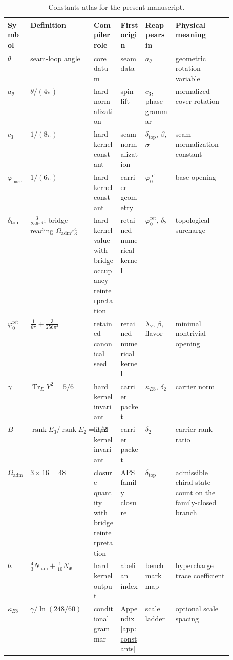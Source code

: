 \documentclass[11pt,a4paper]{article}
\theoremstyle{definition}
\theoremstyle{remark}
\DeclareMathOperator{\tr}{Tr}
\DeclareMathOperator{\rank}{rank}
\newcommand{\cthree}{c_3}
\newcommand{\atheta}{a_\theta}
\newcommand{\phibase}{\varphi_{\mathrm{base}}}
\newcommand{\phiz}{\varphi_0^{\mathrm{ret}}}
\newcommand{\deltatop}{\delta_{\mathrm{top}}}
\newcommand{\bone}{b_1}
\newcommand{\Oadm}{\Omega_{\mathrm{adm}}}
\newcommand{\lambdaY}{\lambda_Y}
\begin{document}
\begin{table}[t]
\centering
\scriptsize
\setlength{\tabcolsep}{3pt}
\begin{tabularx}{\linewidth}{@{}>{\raggedright\arraybackslash}p{0.10\linewidth}>{\raggedright\arraybackslash}p{0.18\linewidth}>{\raggedright\arraybackslash}p{0.12\linewidth}>{\raggedright\arraybackslash}p{0.11\linewidth}YY@{}}
\toprule
Symbol & Definition & Compiler role & First origin & Reappears in & Physical meaning \\
\midrule
$\theta$ & seam-loop angle & core datum & seam data & $\atheta$ & geometric rotation variable \\
$\atheta$ & $\theta/(4\pi)$ & hard normalization & spin lift & $\cthree$, phase grammar & normalized cover rotation \\
$\cthree$ & $1/(8\pi)$ & hard kernel constant & seam normalization & $\deltatop$, $\beta$, $\sigma$ & seam normalization constant \\
$\phibase$ & $1/(6\pi)$ & hard kernel constant & carrier geometry & $\phiz$ & base opening \\
$\deltatop$ & $\frac{3}{256\pi^4}$; bridge reading $\Oadm\cthree^4$ & hard kernel value with bridge occupancy reinterpretation & retained numerical kernel & $\phiz$, $\delta_2$ & topological surcharge \\
$\phiz$ & $\frac{1}{6\pi}+\frac{3}{256\pi^4}$ & retained canonical seed & retained numerical kernel & $\lambdaY$, $\beta$, flavor & minimal nontrivial opening \\
$\gamma$ & $\tr_EY^2=5/6$ & hard kernel invariant & carrier packet & $\kappa_{E8}$, $\delta_2$ & carrier norm \\
$B$ & $\rank E_3/\rank E_2=3/2$ & hard kernel invariant & carrier packet & $\delta_2$ & carrier rank ratio \\
$\Oadm$ & $3\times16=48$ & closure quantity with bridge reinterpretation & APS family closure & $\deltatop$ & admissible chiral-state count on the family-closed branch \\
$\bone$ & $\frac43N_{\mathrm{fam}}+\frac1{10}N_\Phi$ & hard kernel output & abelian index & benchmark map & hypercharge trace coefficient \\
$\kappa_{E8}$ & $\gamma/\ln(248/60)$ & conditional grammar & Appendix~\ref{app:constants} & scale ladder & optional scale spacing \\
\bottomrule
\end{tabularx}
\caption{Constants atlas for the present manuscript.}
\label{tab:constants-atlas}
\end{table}
\end{document}
